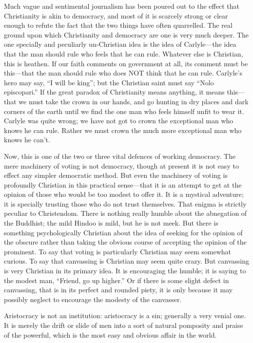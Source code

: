 Much vague and sentimental journalism has been poured out to the effect that Christianity is akin to democracy, and most of it is scarcely strong or clear enough to refute the fact that the two things have often quarrelled. The real ground upon which Christianity and democracy are one is very much deeper. The one specially and peculiarly un-Christian idea is the idea of Carlyle—the idea that the man should rule who feels that he can rule. Whatever else is Christian, this is heathen. If our faith comments on government at all, its comment must be this—that the man should rule who does NOT think that he can rule. Carlyle’s hero may say, “I will be king”; but the Christian saint must say “Nolo episcopari.” If the great paradox of Christianity means anything, it means this—that we must take the crown in our hands, and go hunting in dry places and dark corners of the earth until we find the one man who feels himself unfit to wear it. Carlyle was quite wrong; we have not got to crown the exceptional man who knows he can rule. Rather we must crown the much more exceptional man who knows he can’t.

Now, this is one of the two or three vital defences of working democracy. The mere machinery of voting is not democracy, though at present it is not easy to effect any simpler democratic method. But even the machinery of voting is profoundly Christian in this practical sense—that it is an attempt to get at the opinion of those who would be too modest to offer it. It is a mystical adventure; it is specially trusting those who do not trust themselves. That enigma is strictly peculiar to Christendom. There is nothing really humble about the abnegation of the Buddhist; the mild Hindoo is mild, but he is not meek. But there is something psychologically Christian about the idea of seeking for the opinion of the obscure rather than taking the obvious course of accepting the opinion of the prominent. To say that voting is particularly Christian may seem somewhat curious. To say that canvassing is Christian may seem quite crazy. But canvassing is very Christian in its primary idea. It is encouraging the humble; it is saying to the modest man, “Friend, go up higher.” Or if there is some slight defect in canvassing, that is in its perfect and rounded piety, it is only because it may possibly neglect to encourage the modesty of the canvasser.

Aristocracy is not an institution: aristocracy is a sin; generally a very venial one. It is merely the drift or slide of men into a sort of natural pomposity and praise of the powerful, which is the most easy and obvious affair in the world.

